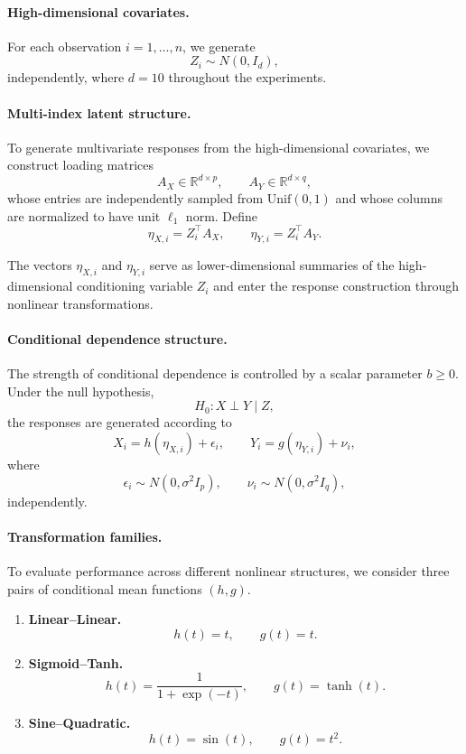 \documentclass[12pt,reqno,oneside]{amsbook}
\theoremstyle{definition}
\theoremstyle{remark}
\begin{document}
\paragraph{High-dimensional covariates.}
For each observation $i=1,\ldots,n$, we generate
\[
Z_i \sim N(0,I_d),
\]
independently, where $d=10$ throughout the experiments.

\paragraph{Multi-index latent structure.}
To generate multivariate responses from the high-dimensional covariates, we
construct loading matrices
\[
A_X\in\mathbb R^{d\times p},
\qquad
A_Y\in\mathbb R^{d\times q},
\]
whose entries are independently sampled from $\mathrm{Unif}(0,1)$ and whose
columns are normalized to have unit $\ell_1$ norm. Define
\[
\eta_{X,i}=Z_i^\top A_X,
\qquad
\eta_{Y,i}=Z_i^\top A_Y.
\]

The vectors $\eta_{X,i}$ and $\eta_{Y,i}$ serve as lower-dimensional summaries
of the high-dimensional conditioning variable $Z_i$ and enter the response
construction through nonlinear transformations.

\paragraph{Conditional dependence structure.}

The strength of conditional dependence is controlled by a scalar parameter
$b\ge0$. Under the null hypothesis,
\[
H_0:X\perp Y\mid Z,
\]
the responses are generated according to
\[
X_i=h(\eta_{X,i})+\epsilon_i,
\qquad
Y_i=g(\eta_{Y,i})+\nu_i,
\]
where
\[
\epsilon_i\sim N(0,\sigma^2I_p),
\qquad
\nu_i\sim N(0,\sigma^2I_q),
\]
independently.
\paragraph{Transformation families.}

To evaluate performance across different nonlinear structures, we consider
three pairs of conditional mean functions $(h,g)$.

\begin{enumerate}

\item \textbf{Linear--Linear.}
\[
h(t)=t,
\qquad
g(t)=t.
\]

\item \textbf{Sigmoid--Tanh.}
\[
h(t)=\frac{1}{1+\exp(-t)},
\qquad
g(t)=\tanh(t).
\]

\item \textbf{Sine--Quadratic.}
\[
h(t)=\sin(t),
\qquad
g(t)=t^2.
\]

\end{enumerate}
\end{document}
